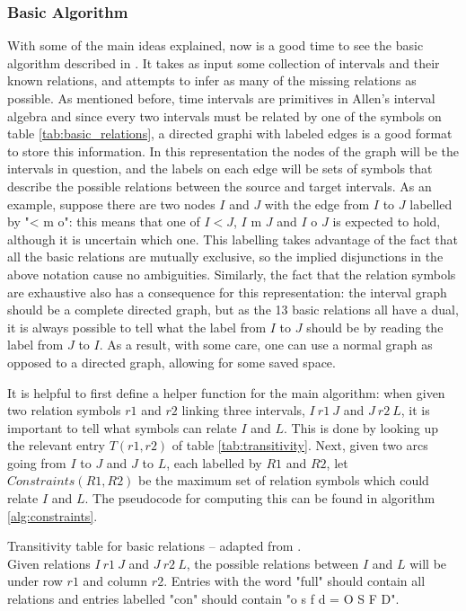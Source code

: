 \subsubsection{Basic Algorithm}%
\label{ssub:basic_algorithm}

With some of the main ideas explained, now is a good time to see the basic algorithm described in
\cite{allen83}. It takes as input some collection of intervals and their known relations, and
attempts to infer as many of the missing relations as possible. As mentioned
before, time intervals are primitives in Allen's interval algebra and since every two intervals
must be related by one of the symbols on table \ref{tab:basic_relations}, a directed graphi with
labeled edges is a good format to store this information. In this representation the nodes of the
graph will be the intervals in question, and the labels on each edge will be sets of symbols that
describe the possible relations between the source and target intervals. As an example, suppose
there are two nodes $I$ and $J$ with the edge from $I$ to $J$ labelled by "< m o": this
means that one of $I < J$, $I\text{ m }J$ and $I\text{ o }J$ is expected to hold, although it is
uncertain which one. This labelling takes advantage of the fact that all the basic relations
are mutually exclusive, so the implied disjunctions in the above notation cause no ambiguities.
Similarly, the fact that the relation symbols are exhaustive also has a consequence for this
representation: the interval graph should be a complete directed graph, but as the 13 basic
relations all have a dual, it is always possible to tell what the label from $I$ to $J$ should be
by reading the label from $J$ to $I$. As a result, with some care, one can use a normal graph
as opposed to a directed graph, allowing for some saved space.

It is helpful to first define a helper function for the main algorithm: when given two relation
symbols $r1$ and $r2$ linking three intervals, $I\ r1\ J$ and $J\ r2\ L$, it is important to tell
what symbols can relate $I$ and $L$. This is done by looking up the relevant entry $T(r1,r2)$ of
table \ref{tab:transitivity}. Next, given two arcs going from $I$ to $J$ and $J$ to $L$, each
labelled by $R1$ and $R2$, let $\textit{Constraints}(R1,R2)$ be the maximum set of relation
symbols which could relate $I$ and $L$. The pseudocode for computing this can be found in
algorithm \ref{alg:constraints}.

\begin{table}[htpb]
  \centering
  
  \caption{Transitivity table for basic relations -- adapted from \cite{thomaswebsite}.\\
  Given relations $I\ r1\ J$ and $J\ r2\ L$,
  the possible relations between $I$ and $L$ will be under row $r1$ and column $r2$. Entries
  with the word "full" should contain all relations and entries labelled "con" should contain
  "o s f d = O S F D".}
  \label{tab:transitivity}
\end{table}


